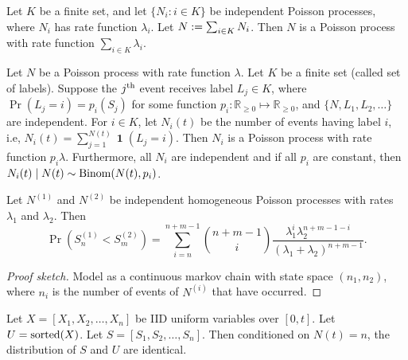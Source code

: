 \documentclass[a4paper, 12pt, fleqn]{article}
\DeclareMathOperator{\boolone}{\mathbf{1}}
\begin{document}
\begin{theorem}
Let $K$ be a finite set, and let $\{N_i: i \in K\}$ be independent Poisson processes,
where $N_i$ has rate function $\lambda_i$. Let $N := \sum_{i \in K}N_i$.
Then $N$ is a Poisson process with rate function $\sum_{i \in K} \lambda_i$.
\end{theorem}

\begin{theorem}
Let $N$ be a Poisson process with rate function $\lambda$. Let $K$ be a finite set (called set of labels).
Suppose the $j^{\textrm{th}}$ event receives label $L_j \in K$, where $\Pr(L_j = i) = p_i(S_j)$
for some function $p_i: \mathbb{R}_{\ge 0} \mapsto \mathbb{R}_{\ge 0}$,
and $\{N, L_1, L_2, \ldots\}$ are independent.
For $i \in K$, let $N_i(t)$ be the number of events having label $i$, i.e,
$N_i(t) = \sum_{j=1}^{N(t)} \boolone(L_j = i)$.
Then $N_i$ is a Poisson process with rate function $p_i \lambda$.
Furthermore, all $N_i$ are independent and if all $p_i$ are constant, then
$N_i(t) \mid N(t) \sim \operatorname{Binom}(N(t), p_i)$.
\end{theorem}

\begin{lemma}
Let $N^{(1)}$ and $N^{(2)}$ be independent homogeneous Poisson processes
with rates $\lambda_1$ and $\lambda_2$. Then
\[ \Pr(S^{(1)}_n < S^{(2)}_m) = \sum_{i=n}^{n+m-1} \binom{n+m-1}{i}
    \frac{\lambda_1^i\lambda_2^{n+m-1-i}}{(\lambda_1 + \lambda_2)^{n+m-1}}. \]
\end{lemma}
\begin{proof}[Proof sketch]
Model as a continuous markov chain with state space $(n_1, n_2)$,
where $n_i$ is the number of events of $N^{(i)}$ that have occurred.
\end{proof}

\begin{theorem}
Let $X = [X_1, X_2, \ldots, X_n]$ be IID uniform variables over $[0, t]$.
Let $U = \operatorname{sorted}(X)$. Let $S = [S_1, S_2, \ldots, S_n]$.
Then conditioned on $N(t) = n$, the distribution of $S$ and $U$ are identical.
\end{theorem}
\end{document}
